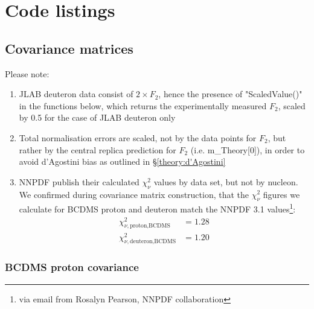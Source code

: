 \documentclass[12pt,a4paper]{report}
\begin{document}
\appendix

\chapter{Code listings}

\section{Covariance matrices} \label{code:covar}

Please note:
\begin{enumerate}
\item JLAB deuteron data\cite{JLAB} consist of $2 \times F_2$, hence the presence of "ScaledValue()" in the functions below, which returns the experimentally measured $F_2$, scaled by 0.5 for the case of JLAB deuteron only
\item Total normalisation errors are scaled, not by the data points for $F_2$, but rather by the central replica prediction for $F_2$ (i.e. m\_Theory[0]), in order to avoid d'Agostini bias as outlined in \S \ref{theory:d'Agostini}
\item NNPDF publish\cite[pg 22]{NNPDF31} their calculated $\chi_\nu^2$ values by data set, but not by nucleon. We confirmed during covariance matrix construction, that the $\chi_\nu^2$ figures we calculate for BCDMS proton and deuteron match the NNPDF 3.1 values\footnote{via email from Rosalyn Pearson, NNPDF collaboration}:
\begin{align}
\label{eq:chisq_BCDMS_proton} \chi_{\nu,\textrm{proton,BCDMS}}^2 &= 1.28\\
\label{eq:chisq_BCDMS_deuteron} \chi_{\nu,\textrm{deuteron,BCDMS}}^2 &= 1.20
\end{align}
\end{enumerate}

\subsection{BCDMS proton \cite{BCDMS:Proton} covariance}
\end{document}
